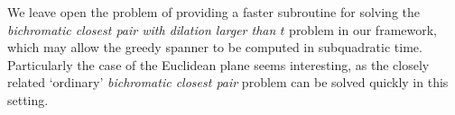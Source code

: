 \documentclass[runningheads,envcountsame,oribibl,orivec]{llncs}
\begin{document}
We leave open the problem of providing a faster subroutine for solving the \emph{bichromatic closest pair with dilation larger than $t$} problem in our framework, which may allow the greedy spanner to be computed in subquadratic time. Particularly the case of the Euclidean plane seems interesting, as the closely related `ordinary' \emph{bichromatic closest pair} problem can be solved quickly in this setting.



\end{document}
